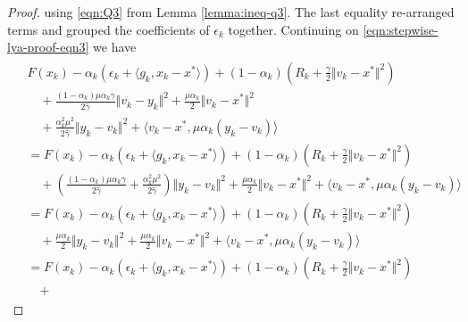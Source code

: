 \documentclass[12pt]{article}
\begin{document}
\begin{proof}
        using \eqref{eqn:Q3} from Lemma \ref{lemma:ineq-q3}.
        The last equality re-arranged terms and grouped the coefficients of $\epsilon_k$ together.
        Continuing on \eqref{eqn:stepwise-lya-proof-eqn3} we have
        \begin{align}\label{eqn:stepwise-lya-proof-eqn3.1}
        \begin{split}
            &
            F(x_k) - \alpha_k(\epsilon_k + \langle g_k, x_k - x^*\rangle)
            +
            (1 - \alpha_k)\left(
                R_k + \frac{\gamma}{2}\Vert v_k - x^*\Vert^2
            \right)
            \\&\quad
                + \frac{(1 - \alpha_k)\mu\alpha_k\gamma}{2\hat \gamma}\Vert v_k - y_k\Vert^2
                + \frac{\mu \alpha_k}{2}\Vert v_k - x^*\Vert^2
            \\&\quad
                + \frac{\alpha_k^2 \mu^2}{2\hat \gamma}\Vert y_k - v_k\Vert^2
                + \langle v_k - x^*, \mu\alpha_k(y_k - v_k)\rangle
            \\
            &=
            F(x_k) - \alpha_k(\epsilon_k + \langle g_k, x_k - x^*\rangle)
            +
            (1 - \alpha_k)\left(
                R_k + \frac{\gamma}{2}\Vert v_k - x^*\Vert^2
            \right)
            \\ &\quad
                +
                \left(
                    \frac{(1 - \alpha_k)\mu\alpha_k\gamma}{2\hat \gamma}
                    +
                    \frac{\alpha_k^2 \mu^2}{2\hat \gamma}
                \right)\Vert y_k - v_k\Vert^2
                + \frac{\mu \alpha_k}{2}\Vert v_k - x^*\Vert^2
                + \langle v_k - x^*, \mu\alpha_k(y_k - v_k)\rangle
            \\
            & =
            F(x_k) - \alpha_k(\epsilon_k + \langle g_k, x_k - x^*\rangle)
            +
            (1 - \alpha_k)\left(
                R_k + \frac{\gamma}{2}\Vert v_k - x^*\Vert^2
            \right)
            \\ &\quad
                +
                \frac{\mu \alpha_k}{2}\Vert y_k - v_k\Vert^2
                + \frac{\mu \alpha_k}{2}\Vert v_k - x^*\Vert^2
                + \langle v_k - x^*, \mu\alpha_k(y_k - v_k)\rangle
            \\ &=
            F(x_k) - \alpha_k(\epsilon_k + \langle g_k, x_k - x^*\rangle)
            +
            (1 - \alpha_k)\left(
                R_k + \frac{\gamma}{2}\Vert v_k - x^*\Vert^2
            \right)
            \\ &\quad
                +

\end{split}
\end{align}
\end{proof}
\end{document}
